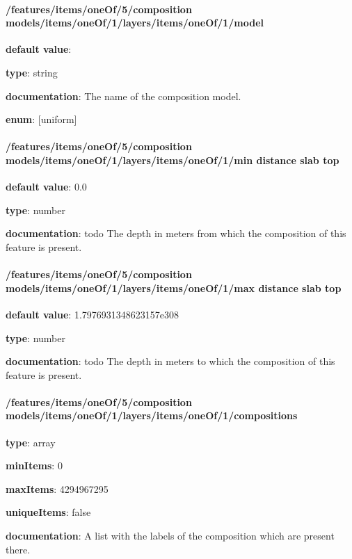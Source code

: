 \paragraph{/features/items/oneOf/5/composition models/items/oneOf/1/layers/items/oneOf/1/model} \begin{itemized}
\item {\bf default value}: 
\item {\bf type}: string
\item {\bf documentation}: The name of the composition model.
\item {\bf enum}: [uniform]\end{itemized}\paragraph{/features/items/oneOf/5/composition models/items/oneOf/1/layers/items/oneOf/1/min distance slab top} \begin{itemized}
\item {\bf default value}: 0.0
\item {\bf type}: number
\item {\bf documentation}: todo The depth in meters from which the composition of this feature is present.
\end{itemized}\paragraph{/features/items/oneOf/5/composition models/items/oneOf/1/layers/items/oneOf/1/max distance slab top} \begin{itemized}
\item {\bf default value}: 1.7976931348623157e308
\item {\bf type}: number
\item {\bf documentation}: todo The depth in meters to which the composition of this feature is present.
\end{itemized}\paragraph{/features/items/oneOf/5/composition models/items/oneOf/1/layers/items/oneOf/1/compositions} \begin{itemized}
\item {\bf type}: array
\item {\bf minItems}: 0
\item {\bf maxItems}: 4294967295
\item {\bf uniqueItems}: false
\item {\bf documentation}: A list with the labels of the composition which are present there.

\end{itemized}
